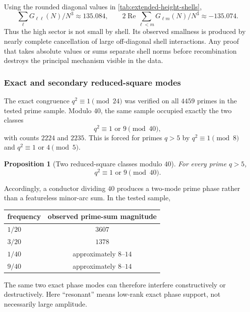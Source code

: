 \documentclass[11pt]{article}
\newtheorem{proposition}[theorem]{Proposition}
\theoremstyle{definition}
\theoremstyle{remark}
\newcommand{\1}{\mathbf{1}}
\newcommand{\Repart}{\operatorname{Re}}
\begin{document}
Using the rounded diagonal values in \cref{tab:extended-height-shells},
\begin{equation}
 \sum_\ell G_{\ell\ell}(N)/N^3\approx135.084,
 \qquad
 2\Repart\sum_{\ell<m}G_{\ell m}(N)/N^3\approx-135.074.
 \label{eq:extended-cross-shell-cancellation}
\end{equation}
Thus the high sector is not small by shell.  Its observed smallness is produced by
nearly complete cancellation of large off-diagonal shell interactions.  Any proof
that takes absolute values or sums separate shell norms before recombination destroys
the principal mechanism visible in the data.

\subsubsection{Exact and secondary reduced-square modes}

The exact congruence $q^2\equiv1\pmod{24}$ was verified on all $4459$ primes in
the tested prime sample.  Modulo $40$, the same sample occupied exactly the two
classes
\begin{equation}
 q^2\equiv1\text{ or }9\pmod{40},
 \label{eq:prime-square-mod40}
\end{equation}
with counts $2224$ and $2235$.  This is forced for primes $q>5$ by
$q^2\equiv1\pmod8$ and $q^2\equiv1$ or $4\pmod5$.

\begin{proposition}[Two reduced-square classes modulo $40$]
\label{prop:prime-square-mod40}
For every prime $q>5$,
\begin{equation}
 \boxed{q^2\equiv1\text{ or }9\pmod{40}.}
 \label{eq:prime-square-mod40-boxed}
\end{equation}
\end{proposition}

Accordingly, a conductor dividing $40$ produces a two-mode prime phase rather than
a featureless minor-arc sum.  In the tested sample,
\begin{center}
\begin{tabular}{lc}
\toprule
frequency & observed prime-sum magnitude\\
\midrule
$1/20$ & $3607$\\
$3/20$ & $1378$\\
$1/40$ & approximately $8$--$14$\\
$9/40$ & approximately $8$--$14$\\
\bottomrule
\end{tabular}
\end{center}
The same two exact phase modes can therefore interfere constructively or
destructively.  Here ``resonant'' means low-rank exact phase support, not necessarily
large amplitude.
\end{document}
